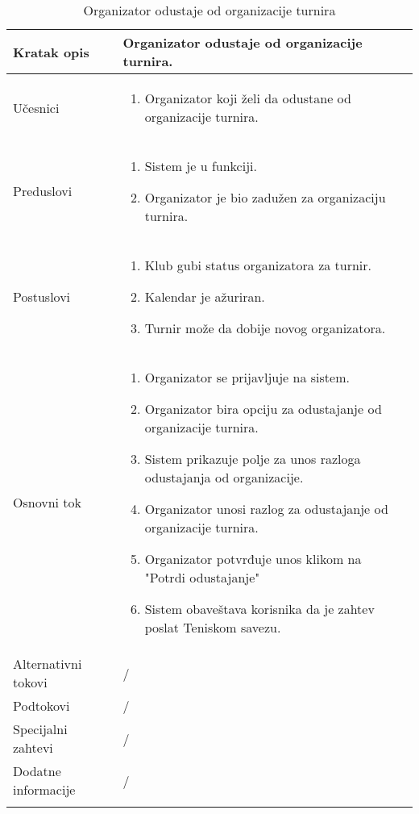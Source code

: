 \documentclass{article}
\begin{document}
\begin{longtable}{| p{} | p{} |} 
\hline
    Kratak opis & Organizator odustaje od organizacije turnira.\\ 
\hline    
    Učesnici & \begin{enumerate}
        \item Organizator koji želi da odustane od organizacije turnira.
    \end{enumerate}
    \\
\hline
   Preduslovi & \begin{enumerate}
       \item Sistem je u funkciji.
       \item Organizator je bio zadužen za organizaciju turnira.
   \end{enumerate}\\
\hline  
    Postuslovi & \begin{enumerate}
        \item Klub gubi status organizatora za turnir.
        \item Kalendar je ažuriran.
        \item Turnir može da dobije novog organizatora.
    \end{enumerate}\\
\hline
    Osnovni tok & \begin{enumerate}
        \item Organizator se prijavljuje na sistem.
        \item Organizator bira opciju za odustajanje od organizacije turnira.
        \item Sistem prikazuje polje za unos razloga odustajanja od organizacije.
        \item Organizator unosi razlog za odustajanje od organizacije turnira.
        \item Organizator potvrđuje unos klikom na "Potrdi odustajanje" 
        \item Sistem obaveštava korisnika da je zahtev poslat Teniskom savezu.

    \end{enumerate}\\
\hline
    Alternativni tokovi & /\\
\hline
    Podtokovi & /\\
\hline
    Specijalni zahtevi & /\\
\hline
    Dodatne informacije & / \\
\hline

\caption{Organizator odustaje od organizacije turnira}
\end{longtable}
\end{document}
